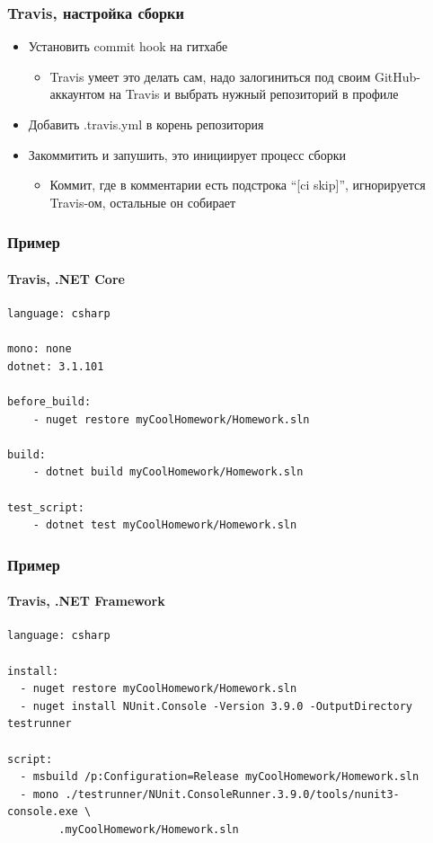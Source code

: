 \documentclass[xetex,mathserif,serif]{beamer}
\begin{document}
	\begin{frame}
		\frametitle{Travis, настройка сборки}
		\begin{itemize}
			\item Установить commit hook на гитхабе
			\begin{itemize}
				\item Travis умеет это делать сам, надо залогиниться под своим GitHub-аккаунтом на Travis и выбрать нужный репозиторий в профиле
			\end{itemize}
			\item Добавить .travis.yml в корень репозитория
			\item Закоммитить и запушить, это инициирует процесс сборки
			\begin{itemize}
				\item Коммит, где в комментарии есть подстрока ``[ci skip]'', игнорируется Travis-ом, остальные он собирает
			\end{itemize}
		\end{itemize}
	\end{frame}

	\begin{frame}[fragile]
		\frametitle{Пример}
		\framesubtitle{Travis, .NET Core}
		\begin{verbatim}
language: csharp

mono: none
dotnet: 3.1.101

before_build: 
    - nuget restore myCoolHomework/Homework.sln

build: 
    - dotnet build myCoolHomework/Homework.sln

test_script: 
    - dotnet test myCoolHomework/Homework.sln
		\end{verbatim}
	\end{frame}

	\begin{frame}[fragile]
		\frametitle{Пример}
		\framesubtitle{Travis, .NET Framework}
		\begin{small}
			\begin{verbatim}
language: csharp

install:
  - nuget restore myCoolHomework/Homework.sln
  - nuget install NUnit.Console -Version 3.9.0 -OutputDirectory testrunner

script:
  - msbuild /p:Configuration=Release myCoolHomework/Homework.sln
  - mono ./testrunner/NUnit.ConsoleRunner.3.9.0/tools/nunit3-console.exe \
        .myCoolHomework/Homework.sln
			\end{verbatim}
		\end{small}
	\end{frame}
\end{document}

